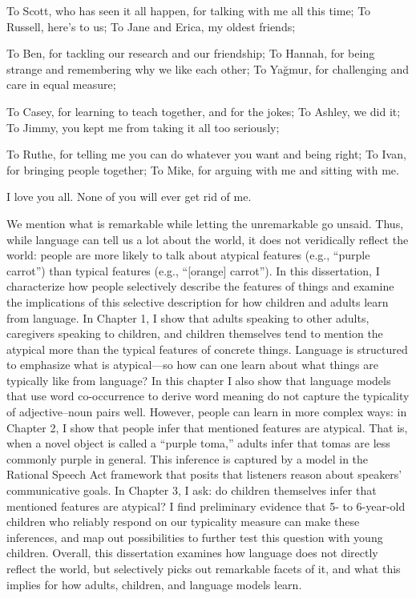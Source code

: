 \documentclass{ucetd}
\begin{document}
To Scott, who has seen it all happen, for talking with me all this time; To Russell, here's to us; To Jane and Erica, my oldest friends;

To Ben, for tackling our research and our friendship; To Hannah, for being strange and remembering why we like each other; To Ya\u{g}mur, for challenging and care in equal measure; 

To Casey, for learning to teach together, and for the jokes; To Ashley, we did it; To Jimmy, you kept me from taking it all too seriously;

To Ruthe, for telling me you can do whatever you want and being right; To Ivan, for bringing people together; To Mike, for arguing with me and sitting with me.

I love you all. None of you will ever get rid of me.

\abstract
We mention what is remarkable while letting the unremarkable go unsaid. Thus, while language can tell us a lot about the world, it does not veridically reflect the world: people are more likely to talk about atypical features (e.g., ``purple carrot'') than typical features (e.g., ``[orange] carrot''). In this dissertation, I characterize how people selectively describe the features of things and examine the implications of this selective description for how children and adults learn from language. In Chapter 1, I show that adults speaking to other adults, caregivers speaking to children, and children themselves tend to mention the atypical more than the typical features of concrete things. Language is structured to emphasize what is atypical—so how can one learn about what things are typically like from language? In this chapter I also show that language models that use word co-occurrence to derive word meaning do not capture the typicality of adjective–noun pairs well. However, people can learn in more complex ways: in Chapter 2, I show that people infer that mentioned features are atypical. That is, when a novel object is called a ``purple toma,'' adults infer that tomas are less commonly purple in general. This inference is captured by a model in the Rational Speech Act framework that posits that listeners reason about speakers' communicative goals. In Chapter 3, I ask: do children themselves infer that mentioned features are atypical? I find preliminary evidence that 5- to 6-year-old children who reliably respond on our typicality measure can make these inferences, and map out possibilities to further test this question with young children. Overall, this dissertation examines how language does not directly reflect the world, but selectively picks out remarkable facets of it, and what this implies for how adults, children, and language models learn.
\end{document}
